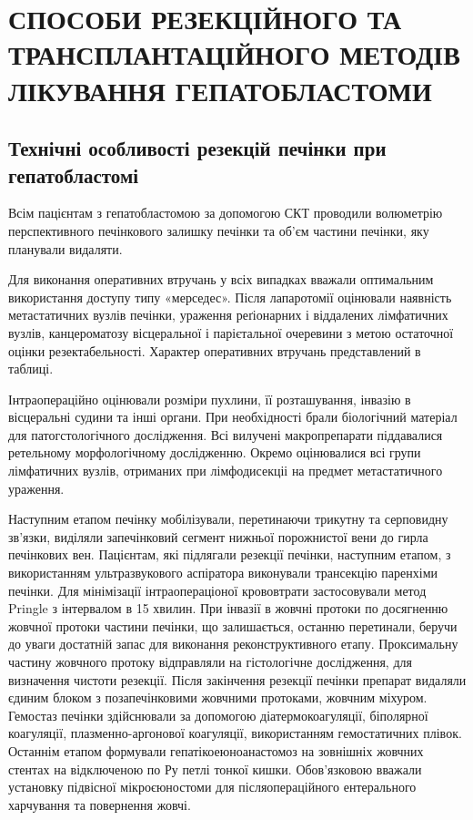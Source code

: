 \chapter{СПОСОБИ РЕЗЕКЦІЙНОГО ТА ТРАНСПЛАНТАЦІЙНОГО МЕТОДІВ ЛІКУВАННЯ ГЕПАТОБЛАСТОМИ}
\section{Технічні особливості резекцій печінки при гепатобластомі}
Всім пацієнтам з гепатобластомою за допомогою СКТ проводили волюметрію перспективного печінкового залишку печінки та об’єм частини печінки, яку планували видаляти. 

Для виконання оперативних втручань у всіх випадках вважали оптимальним використання доступу типу «мерседес». Після лапаротомії оцінювали наявність метастатичних вузлів печінки, ураження реґіонарних і віддалених лімфатичних вузлів, канцероматозу вісцеральної і парієтальної очеревини з метою остаточної оцінки резектабельності. Характер оперативних втручань представлений в таблиці.

Інтраопераційно оцінювали розміри пухлини, її розташування, інвазію в вісцеральні судини та інші органи. При необхідності брали біологічний матеріал для патогстологічного дослідження. Всі вилучені макропрепарати піддавалися ретельному морфологічному дослідженню. Окремо оцінювалися всі групи лімфатичних вузлів, отриманих при лімфодисекціі на предмет метастатичного ураження.

Наступним етапом печінку мобілізували, перетинаючи трикутну та серповидну зв'язки, виділяли запечінковий сегмент нижньої порожнистої вени до гирла печінкових вен. Пацієнтам, які підлягали резекції печінки, наступним етапом, з використанням ультразвукового аспіратора виконували трансекцію паренхіми печінки. Для мінімізації інтраопераціоної крововтрати застосовували метод Pringle з інтервалом в 15 хвилин. При інвазії в жовчні протоки по досягненню жовчної протоки частини печінки, що залишається, останню перетинали, беручи до уваги достатній запас для виконання реконструктивного етапу. Проксимальну частину жовчного протоку відправляли на гістологічне дослідження, для визначення чистоти резекції. Після закінчення резекції печінки препарат видаляли єдиним блоком з позапечінковими жовчними протоками, жовчним міхуром. Гемостаз печінки здійснювали за допомогою діатермокоагуляції, біполярної коагуляції, плазменно-аргонової коагуляції, використанням гемостатичних плівок. Останнім етапом формували гепатікоеюноанастомоз на зовнішніх жовчних стентах на відключеною по Ру петлі тонкої кишки. Обов'язковою вважали установку підвісної мікроєюностоми для післяопераційного ентерального харчування та повернення жовчі.
